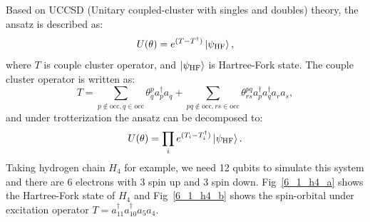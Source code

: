 Based on UCCSD (Unitary coupled-cluster with singles and doubles) theory, the ansatz is described as:
\begin{equation}
    U(\theta) = e^{(T-T^\dagger)}\ket{\psi_\text{HF}},
\end{equation}
where $T$ is couple cluster operator, and $\ket{\psi_\text{HF}}$ is Hartree-Fork state. The couple cluster operator is written as:
\begin{equation}
    T=\sum_{p\notin\text{occ},q\in\text{occ}}\theta_q^p a_p^\dagger a_q + \sum_{pq\notin\text{occ},rs\in\text{occ}}\theta_{rs}^{pq}a_p^\dagger a_q^\dagger a_r a_s,
\end{equation}
and under trotterization the ansatz can be decomposed to:
\begin{equation}
    U(\theta)=\prod_ie^{(T_i-T_i^\dagger)}\ket{\psi_\text{HF}}.
\end{equation}
Taking hydrogen chain $H_4$ for example, we need 12 qubits to simulate this system and there are 6 electrons with 3 spin up and 3 spin down. Fig~\ref{6_1_h4_a} shows the Hartree-Fork state of $H_4$ and Fig~\ref{6_1_h4_b} shows the spin-orbital under excitation operator $T=a_{11}^\dagger a_{10}^\dagger a_5 a_4$.
